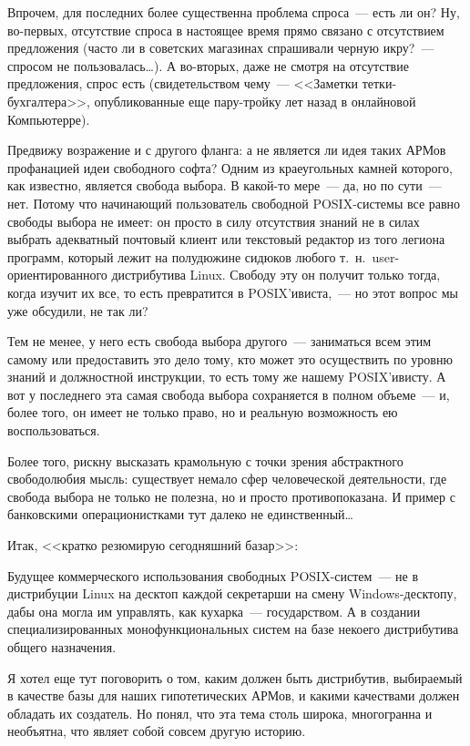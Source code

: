 Впрочем, для последних более существенна проблема спроса~--- есть ли он? Ну, во-первых, отсутствие спроса в настоящее время прямо связано с отсутствием предложения (часто ли в советских магазинах спрашивали черную икру?~--- спросом не пользовалась\dots). А во-вторых, даже не смотря на отсутствие предложения, спрос есть (свидетельством чему~--- <<Заметки тетки-бухгалтера>>, опубликованные еще пару-тройку лет назад в онлайновой Компьютерре).

Предвижу возражение и с другого фланга: а не является ли идея таких АРМов профанацией идеи свободного софта? Одним из краеугольных камней которого, как известно, является свобода выбора. В какой-то мере~--- да, но по сути~--- нет. Потому что начинающий пользователь свободной POSIX-системы все равно свободы выбора не имеет: он просто в силу отсутствия знаний не в силах выбрать адекватный почтовый клиент или текстовый редактор из того легиона программ, который лежит на полудюжине сидюков любого т.~н.~user-ориентированного дистрибутива Linux. Свободу эту он получит только тогда, когда изучит их все, то есть превратится в POSIX'ивиста,~--- но этот вопрос мы уже обсудили, не так ли?

Тем не менее, у него есть свобода выбора другого~--- заниматься всем этим самому или предоставить это дело тому, кто может это осуществить по уровню знаний и должностной инструкции, то есть тому же нашему POSIX'ивисту. А вот у последнего эта самая свобода выбора сохраняется в полном объеме~--- и, более того, он имеет не только право, но и реальную возможность ею воспользоваться.

Более того, рискну высказать крамольную с точки зрения абстрактного свободолюбия мысль: существует немало сфер человеческой деятельности, где свобода выбора не только не полезна, но и просто противопоказана. И пример с банковскими операционистками тут далеко не единственный\dots

Итак, <<кратко резюмирую сегодняшний базар>>:

Будущее коммерческого использования свободных POSIX-систем~--- не в дистрибуции Linux на десктоп каждой секретарши на смену Windows-десктопу, дабы она могла им управлять, как кухарка~--- государством. А в создании специализированных монофункциональных систем на базе некоего дистрибутива общего назначения.


Я хотел еще тут поговорить о том, каким должен быть дистрибутив, выбираемый в качестве базы для наших гипотетических АРМов, и какими качествами должен обладать их создатель. Но понял, что эта тема столь широка, многогранна и необъятна, что являет собой совсем другую историю.


